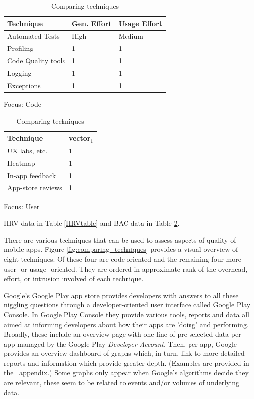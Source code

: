\begin{table}[htbp!]
    \parbox{.40\linewidth}{
        \centering
        \small
        \begin{tabular}{lll}
            Technique  & Gen. Effort & Usage Effort  \\
            \hline
            Automated Tests  & High  & Medium \\ 
            Profiling   & 1 & 1 \\
            Code Quality tools & 1 & 1 \\
            Logging   & 1 & 1 \\ 
            Exceptions  & 1 & 1 \\ 

        \end{tabular}
        \caption{Focus: Code \label{HRVtable}}
    }
    \hfill
    \parbox{.40\linewidth}{
        \centering
        \small
        \begin{tabular}{ll}
            Technique & vector$_1$  \\
            \hline
            UX labs, etc. & 1  \\ 
            Heatmap & 1  \\ 
            In-app feedback & 1  \\ 
            App-store reviews & 1  \\
        \end{tabular}
        \caption{Focus: User \label{BACtable}}}
    \caption{Comparing techniques}
\end{table}

HRV data in Table \ref{HRVtable} and BAC data in Table \ref{BACtable}.

There are various techniques that can be used to assess aspects of quality of mobile apps. Figure \ref{fig:comparing_techniques} provides a visual overview of eight techniques. Of these four are code-oriented and the remaining four more user- or usage- oriented. They are ordered in approximate rank of the overhead, effort, or intrusion involved of each technique. %

Google's Google Play app store provides developers with answers to all these niggling questions through a developer-oriented user interface called Google Play Console. 
In Google Play Console they provide various tools, reports and data all aimed at informing developers about how their apps are 'doing' and performing. Broadly, these include an overview page with one line of pre-selected data per app managed by the Google Play \textit{Developer Account}. Then, per app, Google provides an overview dashboard of graphs which, in turn, link to more detailed reports and information which provide greater depth. (Examples are provided in the~\href{appendix-analytics-tools}{\emph{}} appendix.)  Some graphs only appear when Google's algorithms decide they are relevant, these seem to be related to events and/or volumes of underlying data.




